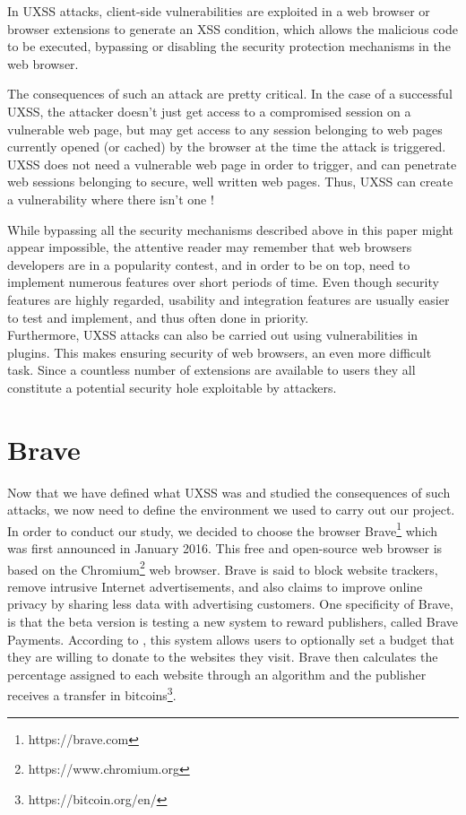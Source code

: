 \documentclass[journal]{IEEEtran}
\begin{document}
\bigskip

In UXSS attacks, client-side vulnerabilities are exploited in a web browser or browser extensions to generate an XSS condition, which allows the malicious code to be executed, bypassing or disabling the security protection mechanisms in the web browser.

\medskip

The consequences of such an attack are pretty critical. In the case of a successful UXSS, the attacker doesn’t just get access to a compromised session on a vulnerable web page, but may get access to any session belonging to web pages currently opened (or cached) by the browser at the time the attack is triggered. UXSS does not need a vulnerable web page in order to trigger, and can penetrate web sessions belonging to secure, well written web pages. Thus, UXSS can create a vulnerability where there isn’t one !

\medskip

While bypassing all the security mechanisms described above in this paper might appear impossible, 
the attentive reader may remember that web browsers developers are in a popularity contest, and in order to be on top, need to implement numerous features over short periods of time. Even though security features are highly regarded, usability and integration features are usually easier to test and implement, and thus often done in priority. \\
Furthermore, UXSS attacks can also be carried out using vulnerabilities in plugins. This makes ensuring security of web browsers, an even more difficult task. Since a countless number of extensions are available to users they all constitute a potential security hole exploitable by attackers.


\section{Brave}

Now that we have defined what UXSS was and studied the consequences of such attacks, we now need to define the environment we used to carry out our project. \\
In order to conduct our study, we decided to choose the browser Brave\footnote{https://brave.com} which was first announced in January 2016. This free and open-source web browser is based on the Chromium\footnote{https://www.chromium.org} web browser. Brave is said to block website trackers, remove intrusive Internet advertisements, and also claims to improve online privacy by sharing less data with advertising customers. One specificity of Brave, is that the beta version is testing a new system to reward publishers, called Brave Payments. According to \cite{braveWikipedia}, this system allows users to optionally set a budget that they are willing to donate to the websites they visit. Brave then calculates the percentage assigned to each website through an algorithm and the publisher receives a transfer in bitcoins\footnote{https://bitcoin.org/en/}.
\end{document}
